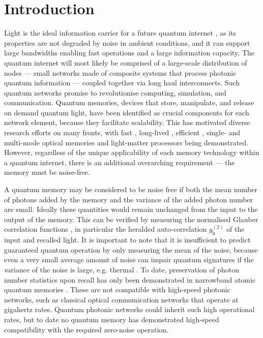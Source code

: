 \documentclass[%
 reprint,
 amsmath,amssymb,
 aps,
 pra,
]{revtex4-1}
\begin{document}
\section{Introduction}
Light is the ideal information carrier for a future quantum internet \cite{Kimble2008}, as its properties are not degraded by noise in ambient conditions, and it can support large bandwidths enabling fast operations and a large information capacity. The quantum internet will most likely be comprised of a large-scale distribution of nodes --- small networks made of composite systems that process photonic quantum information --- coupled together via long haul interconnects. Such quantum networks promise to revolutionise computing, simulation, and communication. Quantum memories, devices that store, manipulate, and release on demand quantum light, have been identified as crucial components for each network element, because they facilitate scalability. This has motivated diverse research efforts on many fronts, with fast \cite{England2015, Fisher2017}, long-lived \cite{Heinze2013, Jobez2015, Seri2017}, efficient \cite{Hedges2010, Chen2013, Cho2016}, single- and multi-mode \cite{Nunn2007, Usmani2010, Gundogan2015, Laplane2016} optical memories and light-matter processors \cite{Hosseini2009, Reim2012, Maxwell2013, Fisher2016, England2016} being demonstrated. However, regardless of the unique applicability of each memory technology within a quantum internet, there is an additional overarching requirement --- the memory must be noise-free.

A quantum memory may be considered to be noise free if both the mean number of photons added by the memory and the variance of the added photon number are small. Ideally these quantities would remain unchanged from the input to the output of the memory. This can be verified by measuring the normalised Glauber correlation functions \cite{Glauber1963}, in particular the heralded auto-correlation $g^{(2)}_\mathrm{h}$ of the input and recalled light. It is important to note that it is insufficient to predict guaranteed quantum operation by only measuring the mean of the noise, because even a very small average amount of noise \cite{Namazi2017} can impair quantum signatures if the variance of the noise is large, e.g. thermal \cite{Michelberger2015}. To date, preservation of photon number statistics upon recall has only been demonstrated in narrowband atomic quantum memories \cite{Chaneliere2005,Eisaman2005,Zhou2012,Ding2016}. These are not compatible with high-speed photonic networks, such as classical optical communication networks that operate at gigahertz rates. Quantum photonic networks could inherit such high operational rates, but to date no quantum memory has demonstrated high-speed compatibility with the required zero-noise operation.
\end{document}
